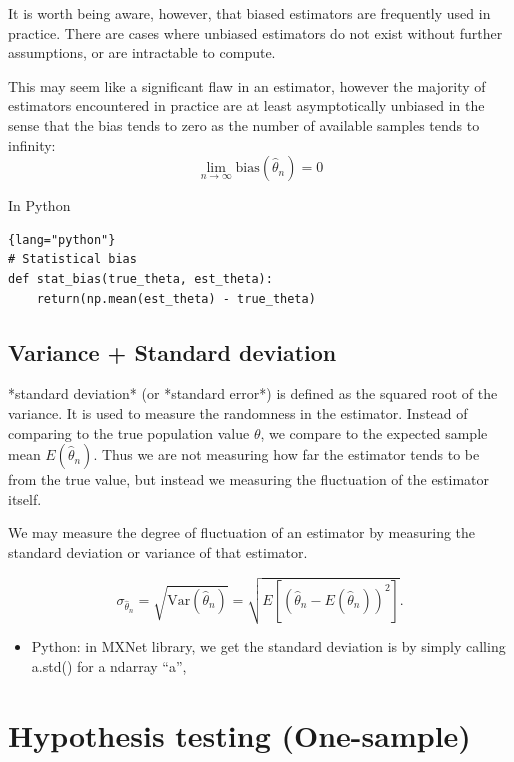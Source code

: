 \begin{mdframed}

It is worth being aware, however, that biased estimators are frequently used in
practice.  There are cases where unbiased estimators do not exist without
further assumptions, or are intractable to compute.

This may seem like a significant flaw in an estimator, however the majority of
estimators encountered in practice are at least asymptotically unbiased in the
sense that the bias tends to zero as the number of available samples tends to
infinity:
$$\lim_{n \rightarrow \infty} \mathrm{bias}(\hat{\theta}_n) = 0$$ 
\end{mdframed}

In Python
\begin{lstlisting}{lang="python"}
# Statistical bias
def stat_bias(true_theta, est_theta):
    return(np.mean(est_theta) - true_theta)
\end{lstlisting}

\subsection{Variance + Standard deviation}
\label{sec:math-variance}

*standard deviation* (or *standard error*) is defined as the squared root of the
variance. It is used to measure the randomness in the estimator. Instead of
comparing to the true population value $\theta$, we compare to the expected
sample mean $E(\hat{\theta}_n)$.
Thus we are not measuring how far the estimator tends to be from the true value,
but instead we measuring the fluctuation of the estimator itself.
 
 
We may measure the degree of fluctuation of an estimator by measuring the
standard deviation or variance of that estimator.

\begin{equation}
\sigma_{\hat{\theta}_n} = \sqrt{\mathrm{Var} (\hat{\theta}_n )} = \sqrt{E[(\hat{\theta}_n - E(\hat{\theta}_n))^2]}.
\end{equation}


\begin{itemize} 
  \item Python:  in MXNet library, we get the standard deviation  is by simply calling a.std() for a ndarray “a”, 
\end{itemize}


\section{Hypothesis testing (One-sample)}
\label{sec:hypothesis-testing}

